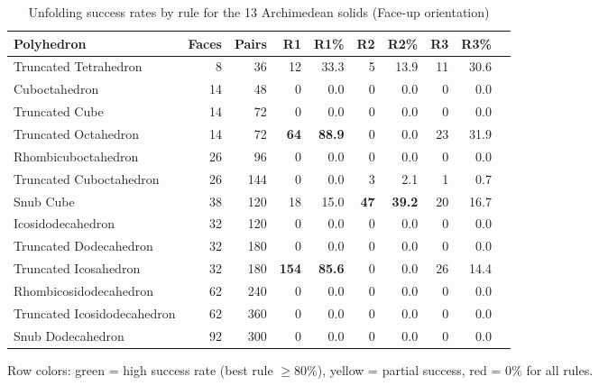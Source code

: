 \documentclass[a4paper,11pt]{article}
\begin{document}
\begin{table}[h]
\centering
\caption{Unfolding success rates by rule for the 13 Archimedean solids (Face-up orientation)}
\label{tab:archimedean}
\renewcommand{\arraystretch}{1.25}
\begin{tabular}{lrrrrrrrrr}
\toprule
Polyhedron & Faces & Pairs
  & R1 & R1\% & R2 & R2\% & R3 & R3\% \\
\midrule
\rowcolor{partial}
Truncated Tetrahedron       &  8 &  36 & 12  & 33.3 &  5 & 13.9 & 11 & 30.6 \\
\rowcolor{zero}
Cuboctahedron               & 14 &  48 &  0  &  0.0 &  0 &  0.0 &  0 &  0.0 \\
\rowcolor{zero}
Truncated Cube              & 14 &  72 &  0  &  0.0 &  0 &  0.0 &  0 &  0.0 \\
\rowcolor{best}
Truncated Octahedron        & 14 &  72 & \textbf{64}  & \textbf{88.9} &  0 &  0.0 & 23 & 31.9 \\
\rowcolor{zero}
Rhombicuboctahedron         & 26 &  96 &  0  &  0.0 &  0 &  0.0 &  0 &  0.0 \\
\rowcolor{zero}
Truncated Cuboctahedron     & 26 & 144 &  0  &  0.0 &  3 &  2.1 &  1 &  0.7 \\
\rowcolor{partial}
Snub Cube                   & 38 & 120 & 18  & 15.0 & \textbf{47} & \textbf{39.2} & 20 & 16.7 \\
\rowcolor{zero}
Icosidodecahedron           & 32 & 120 &  0  &  0.0 &  0 &  0.0 &  0 &  0.0 \\
\rowcolor{zero}
Truncated Dodecahedron      & 32 & 180 &  0  &  0.0 &  0 &  0.0 &  0 &  0.0 \\
\rowcolor{best}
Truncated Icosahedron       & 32 & 180 & \textbf{154} & \textbf{85.6} &  0 &  0.0 & 26 & 14.4 \\
\rowcolor{zero}
Rhombicosidodecahedron      & 62 & 240 &  0  &  0.0 &  0 &  0.0 &  0 &  0.0 \\
\rowcolor{zero}
Truncated Icosidodecahedron & 62 & 360 &  0  &  0.0 &  0 &  0.0 &  0 &  0.0 \\
\rowcolor{zero}
Snub Dodecahedron           & 92 & 300 &  0  &  0.0 &  0 &  0.0 &  0 &  0.0 \\
\bottomrule
\end{tabular}
\end{table}

\noindent
{\footnotesize Row colors: \colorbox{best}{green} = high success rate (best rule $\geq 80\%$),
\colorbox{partial}{yellow} = partial success, \colorbox{zero}{red} = 0\% for all rules.}
\end{document}
